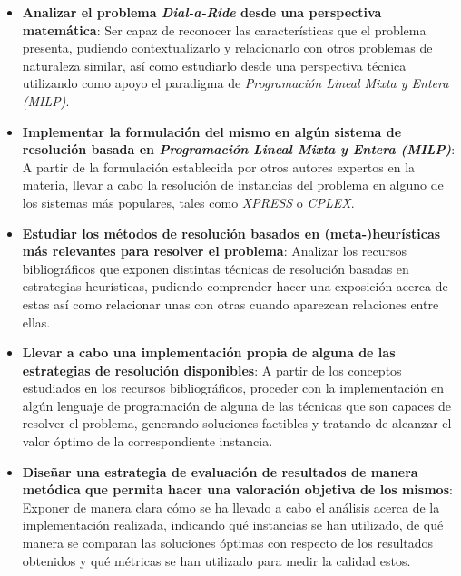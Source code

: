 \documentclass{subfiles}
\begin{document}
      \begin{itemize}

        \item \textbf{Analizar el problema \emph{Dial-a-Ride} desde una perspectiva matemática}: Ser capaz de reconocer las características que el problema presenta, pudiendo contextualizarlo y relacionarlo con otros problemas de naturaleza similar, así como estudiarlo desde una perspectiva técnica utilizando como apoyo el paradigma de \emph{Programación Lineal Mixta y Entera (MILP)}.

        \item \textbf{Implementar la formulación del mismo en algún sistema de resolución basada en \emph{Programación Lineal Mixta y Entera (MILP)}}: A partir de la formulación establecida por otros autores expertos en la materia, llevar a cabo la resolución de instancias del problema en alguno de los sistemas más populares, tales como \emph{XPRESS} o \emph{CPLEX}.

        \item \textbf{Estudiar los métodos de resolución basados en (meta-)heurísticas más relevantes para resolver el problema}: Analizar los recursos bibliográficos que exponen distintas técnicas de resolución basadas en estrategias heurísticas, pudiendo comprender hacer una exposición acerca de estas así como relacionar unas con otras cuando aparezcan relaciones entre ellas.

        \item \textbf{Llevar a cabo una implementación propia de alguna de las estrategias de resolución disponibles}: A partir de los conceptos estudiados en los recursos bibliográficos, proceder con la implementación en algún lenguaje de programación de alguna de las técnicas que son capaces de resolver el problema, generando soluciones factibles y tratando de alcanzar el valor óptimo de la correspondiente instancia.

        \item \textbf{Diseñar una estrategia de evaluación de resultados de manera metódica que permita hacer una valoración objetiva de los mismos}: Exponer de manera clara cómo se ha llevado a cabo el análisis acerca de la implementación realizada, indicando qué instancias se han utilizado, de qué manera se comparan las soluciones óptimas con respecto de los resultados obtenidos y qué métricas se han utilizado para medir la calidad estos.

      \end{itemize}
\end{document}
